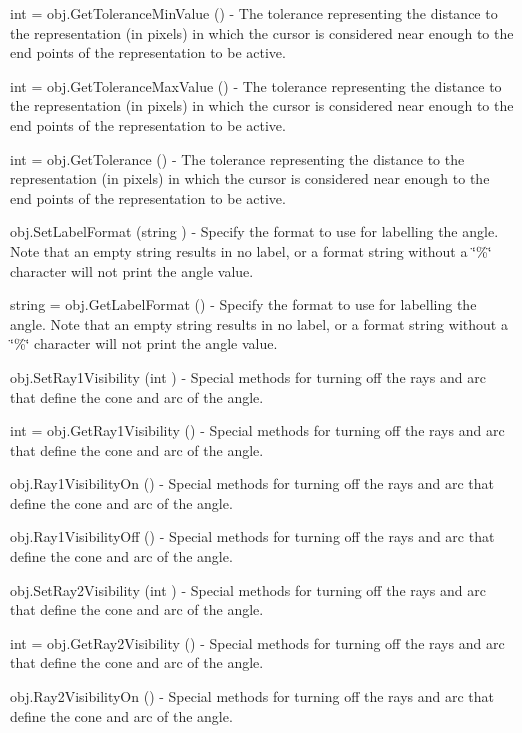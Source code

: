 \begin{DoxyItemize}
\item {\ttfamily int = obj.\-Get\-Tolerance\-Min\-Value ()} -\/ The tolerance representing the distance to the representation (in pixels) in which the cursor is considered near enough to the end points of the representation to be active.  
\item {\ttfamily int = obj.\-Get\-Tolerance\-Max\-Value ()} -\/ The tolerance representing the distance to the representation (in pixels) in which the cursor is considered near enough to the end points of the representation to be active.  
\item {\ttfamily int = obj.\-Get\-Tolerance ()} -\/ The tolerance representing the distance to the representation (in pixels) in which the cursor is considered near enough to the end points of the representation to be active.  
\item {\ttfamily obj.\-Set\-Label\-Format (string )} -\/ Specify the format to use for labelling the angle. Note that an empty string results in no label, or a format string without a \char`\"{}\%\char`\"{} character will not print the angle value.  
\item {\ttfamily string = obj.\-Get\-Label\-Format ()} -\/ Specify the format to use for labelling the angle. Note that an empty string results in no label, or a format string without a \char`\"{}\%\char`\"{} character will not print the angle value.  
\item {\ttfamily obj.\-Set\-Ray1\-Visibility (int )} -\/ Special methods for turning off the rays and arc that define the cone and arc of the angle.  
\item {\ttfamily int = obj.\-Get\-Ray1\-Visibility ()} -\/ Special methods for turning off the rays and arc that define the cone and arc of the angle.  
\item {\ttfamily obj.\-Ray1\-Visibility\-On ()} -\/ Special methods for turning off the rays and arc that define the cone and arc of the angle.  
\item {\ttfamily obj.\-Ray1\-Visibility\-Off ()} -\/ Special methods for turning off the rays and arc that define the cone and arc of the angle.  
\item {\ttfamily obj.\-Set\-Ray2\-Visibility (int )} -\/ Special methods for turning off the rays and arc that define the cone and arc of the angle.  
\item {\ttfamily int = obj.\-Get\-Ray2\-Visibility ()} -\/ Special methods for turning off the rays and arc that define the cone and arc of the angle.  
\item {\ttfamily obj.\-Ray2\-Visibility\-On ()} -\/ Special methods for turning off the rays and arc that define the cone and arc of the angle.  

\end{DoxyItemize}
